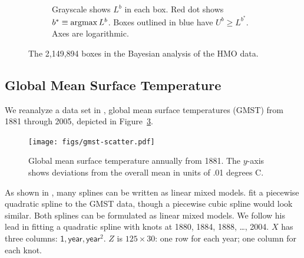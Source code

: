 \documentclass{report}
\newcommand{\textcompute}{\textsf}
\newcommand{\argmax}{\operatornamewithlimits{argmax}}
\begin{document}
\begin{figure}
\begin{subfigure}{.5\textwidth}
	\caption{Grayscale shows $L^b$ in each box.  Red dot shows $b^* \equiv\argmax L^b$.
	Boxes outlined in blue have $U^b \ge L^{b^*}$.  Axes are logarithmic.}
	\label{fig:hmoBayesrll}
  \end{subfigure}
  \caption{The 2,149,894 boxes in the Bayesian analysis of the HMO data.}
  \label{fig:hmoBayes}
\end{figure}

\subsection{Global Mean Surface Temperature}
We reanalyze a data set in \cite{hodges:2013}, global mean surface temperatures (GMST) from 1881 through 2005, depicted in Figure~\ref{fig:gmst-scatter}.  
\begin{figure}
	\centering
	\texttt{[image: figs/gmst-scatter.pdf]}
	\caption{Global mean surface temperature annually from 1881.
		The $y$-axis shows deviations from the overall mean in units of
		.01 degrees C.}
	\label{fig:gmst-scatter}
\end{figure}
As shown in \cite{ruppert_etal:2003}, many splines can be written as linear mixed models.  \cite{hodges:2013} fit a piecewise quadratic spline to the GMST data, though a piecewise cubic spline would look similar.  Both splines can be formulated as linear mixed models.  We follow his lead in fitting a quadratic spline with knots at 1880, 1884, 1888, \dots, 2004.  $X$ has three columns: $\textcompute{1}, \textcompute{year}, \textcompute{year}^2$.  $Z$ is $125 \times 30$: one row for each year; one column for each knot.
\end{document}
